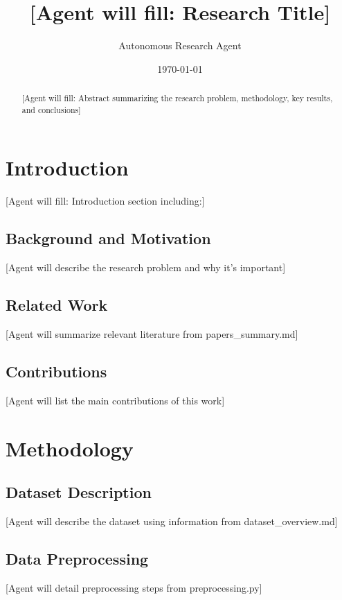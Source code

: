 \documentclass[11pt,a4paper]{article}
\title{[Agent will fill: Research Title]}
\author{Autonomous Research Agent}
\date{\today}
\begin{document}
\maketitle

\begin{abstract}
[Agent will fill: Abstract summarizing the research problem, methodology, key results, and conclusions]
\end{abstract}

\section{Introduction}

[Agent will fill: Introduction section including:]

\subsection{Background and Motivation}
[Agent will describe the research problem and why it's important]

\subsection{Related Work}
[Agent will summarize relevant literature from papers_summary.md]

\subsection{Contributions}
[Agent will list the main contributions of this work]

\section{Methodology}

\subsection{Dataset Description}
[Agent will describe the dataset using information from dataset_overview.md]

\subsection{Data Preprocessing}
[Agent will detail preprocessing steps from preprocessing.py]
\end{document}
